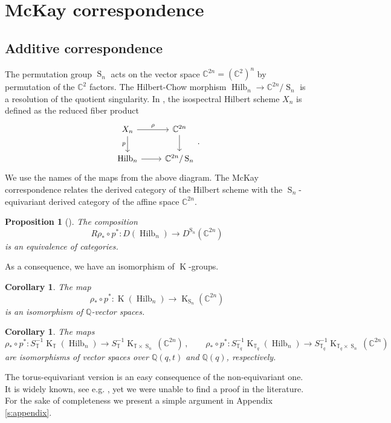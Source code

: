 \documentclass[12pt,a4paper]{amsart}
\theoremstyle{plain}
\newtheorem{pro}[tw]{Proposition}
\newtheorem{cor}[tw]{Corollary}
\theoremstyle{definition}
\theoremstyle{remark}
\newcommand{\Hilb}[1]{\operatorname{Hilb}_{{#1}}}
\newcommand{\Perm}{\operatorname{S}}
\newcommand{\QQ}{\mathbb{Q}}
\newcommand{\CC}{\mathbb{C}}
\newcommand{\TT}{\mathbb{T}}
\newcommand{\Tq}{{\mathbb{T}_q}}
\DeclareMathOperator{\KTh}{K}
\begin{document}
\section{McKay correspondence} \label{s:McKay}
\subsection{Additive correspondence}
The permutation group $\Perm_n$ acts on the vector space $\CC^{2n}=(\CC^2)^{n}$ by permutation of the $\CC^2$ factors. The Hilbert-Chow morphism \hbox{$\Hilb{n} \to \CC^{2n}/\Perm_n$} is a resolution of the quotient singularity. In \cite[Definition 3.2.4]{Haiman}, the  isospectral Hilbert scheme $X_n$ is defined as the reduced fiber product
\begin{equation} \label{diagram2}
	\begin{tikzcd}
		{X_n} & {\CC^{2n}} \\
		{\Hilb{n}} & {\CC^{2n}/\Perm_n}
		\arrow["\rho", from=1-1, to=1-2]
		\arrow["p"', from=1-1, to=2-1]
		\arrow[from=2-1, to=2-2]
		\arrow[from=1-2, to=2-2]
	\end{tikzcd}.
\end{equation}
We use the names of the maps from the above diagram. The McKay correspondence relates the derived category of the Hilbert scheme with the $\Perm_n$-equivariant derived category of the affine space $\CC^{2n}$.
\begin{pro}[{\cite[Corollary 1.3]{BKR}}]
	The composition
	$$R\rho_*\circ p^*\colon D(\Hilb{n}) \to D^{\Perm_n}(\CC^{2n})$$
	is an equivalence of categories.
\end{pro}
\noindent As a consequence, we have an isomorphism of $\KTh$-groups.
\begin{cor}
	The map
	$$\rho_*\circ p^*\colon \KTh(\Hilb{n}) \to \KTh_{\Perm_n}(\CC^{2n})$$
	is an isomorphism of $\QQ$-vector spaces.
\end{cor}
\begin{cor}\label{cor:eq}
	The maps
	$$\rho_*\circ p^*\colon S^{-1}_{\TT}\KTh_{\TT}(\Hilb{n}) \to S^{-1}_{\TT}\KTh_{\TT\times\Perm_n}(\CC^{2n})\,,\qquad
	\rho_*\circ p^*\colon S^{-1}_{\Tq}\KTh_{\Tq}(\Hilb{n}) \to S^{-1}_{\Tq}\KTh_{\Tq\times\Perm_n}(\CC^{2n})$$
	are isomorphisms of vector spaces over $\QQ(q,t)$ and $\QQ(q)$, respectively.
\end{cor}
\noindent The torus-equivariant version is an easy consequence of the non-equivariant one. It is widely known, see e.g. \cite[Section 5.4.3]{Haiman_surv}, yet we were unable to find a proof in the literature. For the sake of completeness we present a simple argument in Appendix \ref{s:appendix}.
\end{document}
